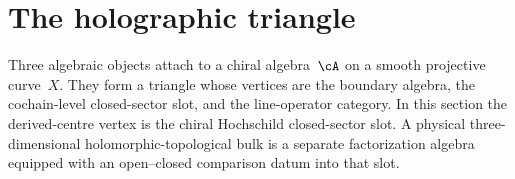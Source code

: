 

\section{The holographic triangle}
\label{sec:holographic-triangle}

Three algebraic objects attach to a chiral algebra~$\cA$ on a smooth
projective curve~$X$. They form a triangle whose vertices are the
boundary algebra, the cochain-level closed-sector slot, and the
line-operator category. In this section the derived-centre vertex is
the chiral Hochschild closed-sector slot. A physical
three-dimensional holomorphic-topological bulk is a separate
factorization algebra equipped with an open--closed comparison datum
into that slot.

